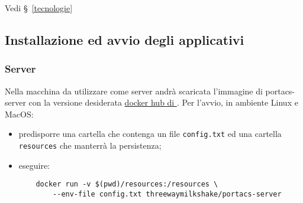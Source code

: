     Vedi \S\ \ref{tecnologie}

    \begin{comment}
    	\item Client:
    \begin{itemize}
    	\item Docker.

    \end{itemize}
    	\item Server:
    \begin{itemize}
    	\item Docker.

    \end{itemize}
    \end{comment}







\subsection{Installazione ed avvio degli applicativi}
    \subsubsection{Server}
    Nella macchina da utilizzare come server andrà scaricata l'immagine di portacs-server con la versione desiderata \href{https://hub.docker.com/r/threewaymilkshake}{docker hub di \group}.
    Per l'avvio, in ambiente Linux e MacOS:
    \begin{itemize}
        \item predisporre una cartella che contenga un file \texttt{config.txt} ed una cartella \texttt{resources} che manterrà la persistenza;
        \item eseguire:
    \begin{verbatim}
    docker run -v $(pwd)/resources:/resources \
        --env-file config.txt threewaymilkshake/portacs-server
    \end{verbatim}
    \end{itemize}

